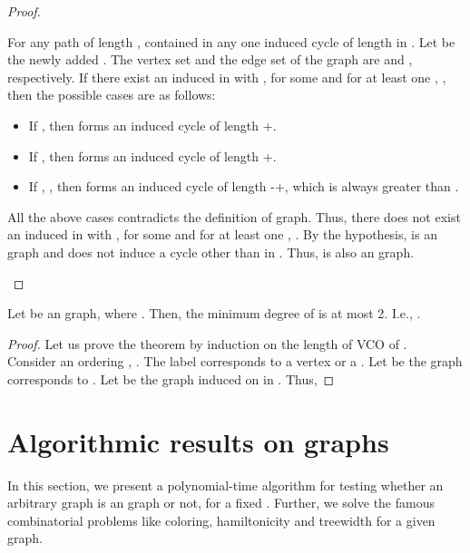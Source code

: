 \documentclass[runningheads]{llncs}
\begin{document}
\begin{proof}
\begin{description}
\begin{description}
For any path of length ,  contained in any one induced cycle  of length  in . Let  be the newly added . The vertex set and the edge set of the graph  are  and , respectively. If there exist an induced  in  with ,  for some  and for at least one , , then the possible cases are as follows:

\begin{itemize}
\item[] If , then  forms an induced cycle of length +.

\item[] If , then   forms an induced cycle of length +.

\item[] If , , then   forms an induced cycle of length -+, which is always greater than .
\end{itemize}


All the above cases contradicts the definition of  graph. Thus, there does not exist an induced  in  with ,  for some  and for at least one , . By the hypothesis,  is an  graph and  does not induce a cycle other than  in . Thus,  is also an  graph.  
\end{description}
\end{description}
\end{proof}



\begin{lemma}
\label{mindegree}
Let  be an  graph, where . Then, the minimum degree of  is at most 2. I.e., .
\end{lemma}

\begin{proof}
Let us prove the theorem by induction on the length  of VCO of .
\\
\noindent Consider an ordering , . The label  corresponds to a vertex  or a . Let  be the graph corresponds to . Let  be the graph induced on  in . Thus,


\end{proof}

\section{Algorithmic results on  graphs}
In this section, we present a polynomial-time algorithm for testing whether an arbitrary graph is an  graph or not, for a fixed . Further, we solve the famous combinatorial problems like coloring, hamiltonicity and treewidth for a given  graph.
\end{document}
